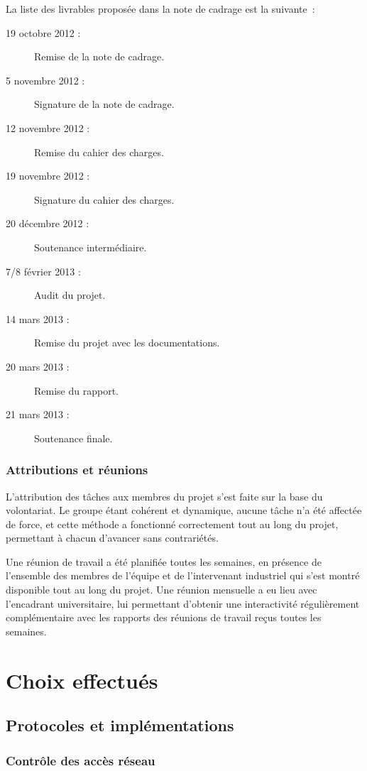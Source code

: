 La liste des livrables proposée dans la note de cadrage est la suivante~:

\begin{description}
\item[19 octobre 2012 :] Remise de la note de cadrage.
\item[5 novembre 2012 :] Signature de la note de cadrage.
\item[12 novembre 2012 :] Remise du cahier des charges.
\item[19 novembre 2012 :] Signature du cahier des charges.
\item[20 décembre 2012 :] Soutenance intermédiaire.
\item[7/8 février 2013 :] Audit du projet.
\item[14 mars 2013 :] Remise du projet avec les documentations.
\item[20 mars 2013 :] Remise du rapport.
\item[21 mars 2013 :] Soutenance finale.
\end{description}

\subsubsection{Attributions et réunions}

L'attribution des tâches aux membres du projet s'est faite sur la base du volontariat. Le groupe étant cohérent et dynamique, aucune tâche n'a été affectée de force, et cette méthode a fonctionné correctement tout au long du projet, permettant à chacun d'avancer sans contrariétés.

Une réunion de travail a été planifiée toutes les semaines, en présence de l'ensemble des membres de l'équipe et de l'intervenant industriel qui s'est montré disponible tout au long du projet. Une réunion mensuelle a eu lieu avec l'encadrant universitaire, lui permettant d'obtenir une interactivité régulièrement complémentaire avec les rapports des réunions de travail reçus toutes les semaines.

\section{Choix effectués}
\subsection{Protocoles et implémentations}
\subsubsection{Contrôle des accès réseau}

